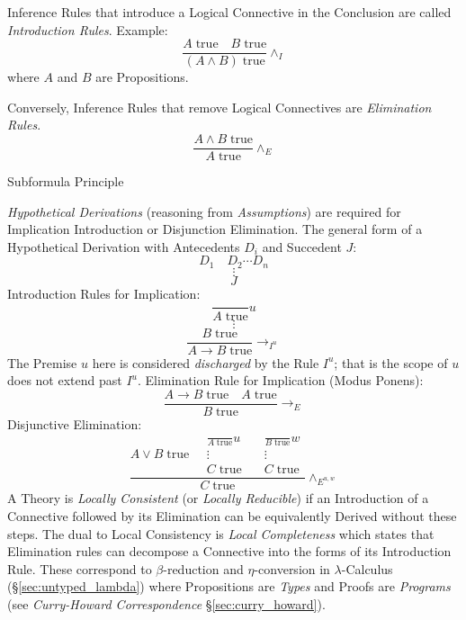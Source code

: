 Inference Rules that introduce a Logical Connective in the Conclusion
are called \emph{Introduction Rules}. Example:
\[
  {
    \frac{A\;\mathrm{true} \quad B\;\mathrm{true}}
    {(A \wedge B)\;\mathrm{true}}
  } \wedge_I
\]
where $A$ and $B$ are Propositions.

Conversely, Inference Rules that remove Logical Connectives are
\emph{Elimination Rules}.
\[
  {
    \frac{A \wedge B\;\mathrm{true}}
    {A\;\mathrm{true}}
  } \wedge_E
\]

Subformula Principle

\emph{Hypothetical Derivations} (reasoning from \emph{Assumptions})
are required for Implication Introduction or Disjunction
Elimination. The general form of a Hypothetical Derivation with
Antecedents $D_i$ and Succedent $J$:
\[
  D_1 \quad D_2 \cdots D_n
\]\[
  \vdots
\]\[
  J
\]
Introduction Rules for Implication:
\[
  {
    \frac{}
    {A\;\mathrm{true}}
  } u
\]\[
  \vdots
\]\[
  {
    \frac{B\;\mathrm{true}}
    {A \rightarrow B\;\mathrm{true}}
  } \rightarrow_{I^u}
\]
The Premise $u$ here is considered \emph{discharged} by the Rule
$I^u$; that is the scope of $u$ does not extend past $I^u$.
Elimination Rule for Implication (Modus Ponens):
\[
  {
    \frac{A \rightarrow B\;\mathrm{true} \quad A\;\mathrm{true}}
    {B\;\mathrm{true}}
  } \rightarrow_{E}
\]
Disjunctive Elimination:
\[
  \frac{
  A \vee B\;\mathrm{true} \quad
  \begin{matrix}
    {
      \frac{}
      {A\;\mathrm{true}}
    }u \\
    \vdots \\
    C\;\mathrm{true}
  \end{matrix}
  \quad
  \begin{matrix}
    {
      \frac{}
      {B\;\mathrm{true}}
    }w \\
    \vdots \\
    C\;\mathrm{true}
  \end{matrix}
  }{ C\;\mathrm{true}}\wedge_{E^{u,w}}
\]
A Theory is \emph{Locally Consistent} (or \emph{Locally Reducible}) if
an Introduction of a Connective followed by its Elimination can be
equivalently Derived without these steps. The dual to Local
Consistency is \emph{Local Completeness} which states that Elimination
rules can decompose a Connective into the forms of its Introduction
Rule. These correspond to $\beta$-reduction and $\eta$-conversion in
$\lambda$-Calculus (\S\ref{sec:untyped_lambda}) where Propositions
are \emph{Types} and Proofs are \emph{Programs} (see
\emph{Curry-Howard Correspondence} \S\ref{sec:curry_howard}).

